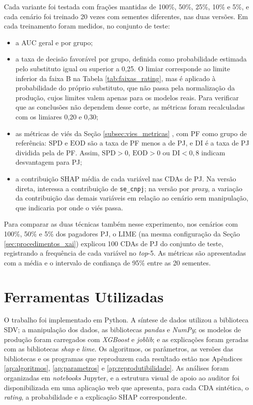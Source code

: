Cada variante foi testada com frações mantidas de 100\%, 50\%, 25\%, 10\% e 5\%, e cada cenário foi treinado 20 vezes com sementes diferentes, nas duas versões. Em cada treinamento foram medidos, no conjunto de teste:

\begin{itemize}
    \item a AUC geral e por grupo;
    \item a taxa de decisão favorável por grupo, definida como probabilidade estimada pelo substituto igual ou superior a 0,25. O limiar corresponde ao limite inferior da faixa B na Tabela \ref{tab:faixas_rating}, mas é aplicado à probabilidade do próprio substituto, que não passa pela normalização da produção, cujos limites valem apenas para os modelos reais. Para verificar que as conclusões não dependem desse corte, as métricas foram recalculadas com os limiares 0,20 e 0,30;
    \item as métricas de viés da Seção \ref{subsec:vies_metricas} \cite{hardtEqualityOpportunitySupervised2016, feldmanCertifyingRemovingDisparate2015}, com PF como grupo de referência: $\mathrm{SPD}$ e $\mathrm{EOD}$ são a taxa de PF menos a de PJ, e $\mathrm{DI}$ é a taxa de PJ dividida pela de PF. Assim, $\mathrm{SPD} > 0$, $\mathrm{EOD} > 0$ ou $\mathrm{DI} < 0{,}8$ indicam desvantagem para PJ;
    \item a contribuição SHAP média de cada variável nas CDAs de PJ. Na versão direta, interessa a contribuição de \texttt{se\_cnpj}; na versão por \textit{proxy}, a variação da contribuição das demais variáveis em relação ao cenário sem manipulação, que indicaria por onde o viés passa.
\end{itemize}

Para comparar as duas técnicas também nesse experimento, nos cenários com 100\%, 50\% e 5\% dos pagadores PJ, o LIME (na mesma configuração da Seção \ref{sec:procedimentos_xai}) explicou 100 CDAs de PJ do conjunto de teste, registrando a frequência de cada variável no \textit{top}-5. As métricas são apresentadas com a média e o intervalo de confiança de 95\% entre as 20 sementes.

\section{Ferramentas Utilizadas}

O trabalho foi implementado em Python. A síntese de dados utilizou a biblioteca SDV; a manipulação dos dados, as bibliotecas \textit{pandas} e \textit{NumPy}; os modelos de produção foram carregados com \textit{XGBoost} e \textit{joblib}; e as explicações foram geradas com as bibliotecas \textit{shap} e \textit{lime}. Os algoritmos, os parâmetros, as versões das bibliotecas e os programas que reproduzem cada resultado estão nos Apêndices \ref{ap:algoritmos}, \ref{ap:parametros} e \ref{ap:reprodutibilidade}. As análises foram organizadas em \textit{notebooks} Jupyter, e a estrutura visual de apoio ao auditor foi disponibilizada em uma aplicação web que apresenta, para cada CDA sintética, o \textit{rating}, a probabilidade e a explicação SHAP correspondente.

